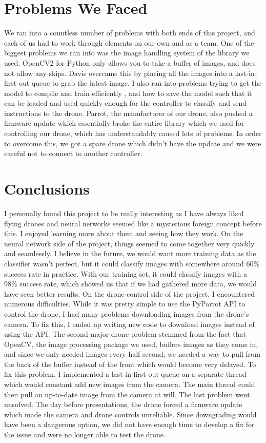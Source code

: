 \documentclass[12pt]{article}
\begin{document}
\section{Problems We Faced}
{
	We ran into a countless number of problems with both ends of this project, and each of us had to work through elements on our own and as a team.
	One of the biggest problems we ran into was the image handling system of the library we used. 
	OpenCV2 for Python only allows you to take a buffer of images, and does not allow any skips. 
	Davis overcame this by placing all the images into a last-in-first-out queue to grab the latest image.  
	I also ran into problems trying to get the model to compile and train efficiently , and how to save the model such that it can be loaded and used quickly enough for the controller to classify and send instructions to the drone. 
	Parrot, the manufactorer of our drone, also pushed a firmware update which essentially broke the entire library which we used for controlling our drone, which has understandably caused lots of problems. 
	In order to overcome this, we got a spare drone which didn't have the update and we were careful not to connect to another controller.
}

\section{Conclusions}
{
	I personally found this project to be really interesting as I have always liked flying drones and neural networks seemed like a mysterious foreign concept before this. I enjoyed learning more about them and seeing how they work. On the neural network side of the project, things seemed to come together very quickly and seamlessly. I believe in the future, we would want more training data as the classifier wasn’t perfect, but it could classify images with somewhere around 60\% success rate in practice. With our training set, it could classify images with a 98\% success rate, which showed us that if we had gathered more data, we would have seen better results. On the drone control side of the project, I encountered numerous difficulties. While it was pretty simple to use the PyParrot API to control the drone, I had many problems downloading images from the drone’s camera. To fix this, I ended up writing new code to download images instead of using the API. The second major drone problem stemmed from the fact that OpenCV, the image processing package we used, buffers images as they come in, and since we only needed images every half second, we needed a way to pull from the back of the buffer instead of the front which would become very delayed. To fix this problem, I implemented a last-in-first-out queue on a separate thread which would constant add new images from the camera. The main thread could then pull an up-to-date image from the camera at will. The last problem went unsolved. The day before presentations, the drone forced a firmware update which made the camera and drone controls unreliable. Since downgrading would have been a dangerous option, we did not have enough time to develop a fix for the issue and were no longer able to test the drone.
}
\end{document}
